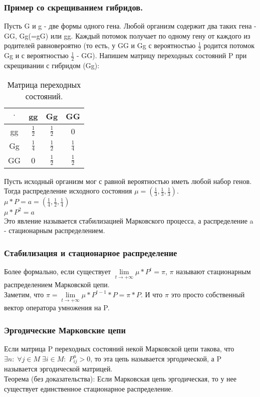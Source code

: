 \subsubsection{Пример со скрещиванием гибридов.}
Пусть G и g - две формы одного гена. Любой организм содержит два таких гена - GG, Gg(=gG) или gg. Каждый потомок получает по одному гену от каждого из родителей равновероятно (то есть, у GG и Gg с вероятностью $\frac{1}{2}$ родится потомок Gg и с вероятностью $\frac{1}{2}$ - GG). Напишем матрицу переходных состояний P при скрещивании с гибридом (Gg):\\
\begin{table}[H]
\caption{Матрица переходных состояний.}
\label{tabular:TransitionStatesMatrix}
\begin{center}
\begin{tabular}{|c|c|c|c|}
\hline
$\cdot$ & gg & Gg & GG\\
\hline
gg & $\frac{1}{2}$ & $\frac{1}{2}$ & 0\\
\hline
Gg & $\frac{1}{4}$ & $\frac{1}{2}$ & $\frac{1}{4}$\\
\hline
GG & 0 & $\frac{1}{2}$ & $\frac{1}{2}$\\
\hline
\end{tabular}
\end{center}
\end{table}
Пусть исходный организм мог с равной вероятностью иметь любой набор генов. Тогда распределение исходного состояния $\mu = (\frac{1}{3}, \frac{1}{3}, \frac{1}{3})$.\\
$\mu * P = a = (\frac{1}{4}, \frac{1}{2}, \frac{1}{4})$\\
$\mu * P^2 = a$\\
Это явление называется стабилизацией Марковского процесса, а распределение a - стационарным распределением.
\subsubsection{Стабилизация и стационарное распределение}
Более формально, если существует $\lim\limits_{t \to +\infty} \mu * P^t = \pi$, $\pi$ называют стационарным распределением Марковской цепи.\\
Заметим, что $\pi = \lim\limits_{t \to +\infty} \mu * P^{t - 1} * P = \pi * P$. И что $\pi$ это просто собственный вектор оператора умножения на P.\\
\subsubsection{Эргодические Марковские цепи}
Если матрица P переходных состояний некой Марковской цепи такова, что $\exists n: \; \forall j \in M \; \exists i \in M: \; P^n_{ij} > 0$, то эта цепь называется эргодической, а P называется эргодической матрицей.\\
Теорема (без доказательства): Если Марковская цепь эргодическая, то у нее существует единственное стационарное распределение.
